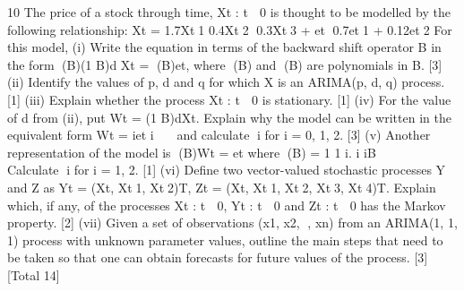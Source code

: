 \documentclass[a4paper,12pt]{article}
\begin{document}
\begin{enumerate}

10 The price of a stock through time, {Xt : t  0} is thought to be modelled by the
following relationship:
Xt = 1.7Xt1 	 0.4Xt2 	0.3Xt3 + et 	0.7et1 + 0.12et2
For this model,
(i) Write the equation in terms of the backward shift operator B in the form
(B)(1 	 B)d Xt = (B)et,
where (B) and (B) are polynomials in B. [3]
(ii) Identify the values of p, d and q for which X is an ARIMA(p, d, q) process. [1]
(iii) Explain whether the process {Xt : t  0} is stationary. [1]
(iv) For the value of d from (ii), put Wt = (1 	 B)dXt. Explain why the model can
be written in the equivalent form
Wt = iet i  
and calculate i for i = 0, 1, 2. [3]
(v) Another representation of the model is
(B)Wt = et
where (B) = 1 	 1 i.
i iB 

  Calculate i for i = 1, 2. [1]
(vi) Define two vector-valued stochastic processes Y and Z as
Yt = (Xt, Xt1, Xt2)T, Zt = (Xt, Xt1, Xt2, Xt3, Xt4)T.
Explain which, if any, of the processes {Xt : t  0}, {Yt : t  0} and {Zt : t  0}
has the Markov property. [2]
(vii) Given a set of observations (x1, x2, , xn) from an ARIMA(1, 1, 1) process
with unknown parameter values, outline the main steps that need to be taken
so that one can obtain forecasts for future values of the process. [3]
[Total 14]




\end{enumerate}
\end{document}
